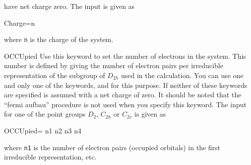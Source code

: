 \begin{keywordlist}
have net charge zero.
The input is given as
\begin{inputlisting}
Charge=n
\end{inputlisting}
where \verb+n+ is the charge of the system.
\item[OCCUpied]
Use this keyword to set the number of electrons in the system.
This number is defined by giving the number of electron pairs
per irreducible representation of the subgroup of $D_{2h}$ used
in the calculation.
You can use one and only one of the keywords,
 and
 for this purpose.
If neither of these keywords are specified
 is assumed with a net charge of zero.
It should be noted that the ``fermi aufbau''
procedure is not used when you specify this keyword.
The input for one of the point groups $D_2$, $C_{2h}$ or $C_{2v}$
is given as
\begin{inputlisting}
OCCUpied= n1 n2 n3 n4
\end{inputlisting}
where \verb+n1+ is the number of electron pairs (occupied orbitals)
in the first irreducible representation, etc.


\end{keywordlist}

